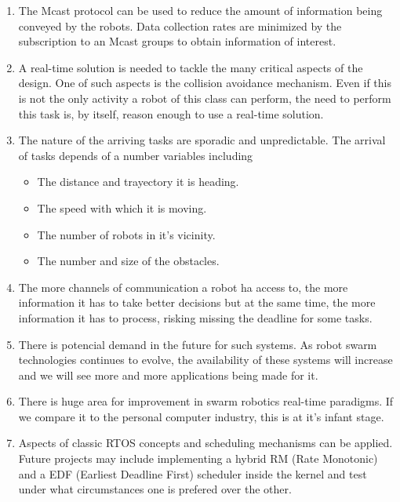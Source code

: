 \documentclass[journal]{IEEEtran}
\begin{document}
\begin{enumerate}
\item The Mcast protocol can be used to reduce the amount of information being conveyed by the robots. Data collection rates are minimized by the subscription to an Mcast groups to obtain information of interest.

\item A real-time solution is needed to tackle the many critical aspects of the design. One of such aspects is the collision avoidance mechanism. Even if this is not the only activity a robot of this class can perform, the need to perform this task is, by itself, reason enough to use a real-time solution.

\item The nature of the arriving tasks are sporadic and unpredictable. The arrival of tasks depends of a number variables including

\begin{itemize}
\item The distance and trayectory it is heading.
\item The speed with which it is moving.
\item The number of robots in it's vicinity.
\item The number and size of the obstacles.
\end{itemize}

\item The more channels of communication a robot ha access to, the more information it has to take better decisions but at the same time, the more information it has to process, risking missing the deadline for some tasks.

\item There is potencial demand in the future for such systems. As robot swarm technologies continues to evolve, the availability of these systems will increase and we will see more and more applications being made for it.

\item There is huge area for improvement in swarm robotics real-time paradigms. If we compare it to the personal computer industry, this is at it's infant stage.

\item Aspects of classic RTOS concepts and scheduling mechanisms can be applied. Future projects may include implementing a hybrid RM (Rate Monotonic) and a EDF (Earliest Deadline First) scheduler inside the kernel and test under what circumstances one is prefered over the other.

\end{enumerate}
\end{document}
